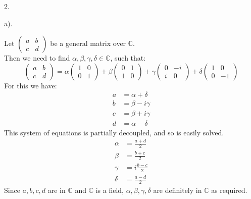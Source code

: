 \documentclass[a4paper,12pt]{article}
\begin{document}
2.
\begin{minipage}[t]{0.9\textwidth}
  a).
  \begin{minipage}[t]{\textwidth}
    Let $\left(\begin{matrix} a & b \\ c & d\end{matrix}\right)$ be a general matrix over $\mathbb{C}$.\\
    Then we need to find $\alpha, \beta, \gamma, \delta \in \mathbb{C}$, such that:
    \begin{equation*}
      \left(\begin{matrix} a & b \\ c & d\end{matrix}\right) = \alpha \left(\begin{matrix}1 & 0 \\ 0 & 1\end{matrix}\right)
        + \beta \left(\begin{matrix}0 & 1 \\ 1 & 0\end{matrix}\right) + \gamma \left(\begin{matrix}0 & -i \\ i & 0\end{matrix}\right) + \delta\left(\begin{matrix}1 & 0 \\ 0 & -1\end{matrix}\right)
    \end{equation*}
    For this we have:
    \begin{align*}
      a &= \alpha + \delta\\
      b &= \beta -i\gamma\\
      c &= \beta  + i\gamma\\
      d &= \alpha - \delta
    \end{align*}
    This system of equations is partially decoupled, and so is easily solved.
    \begin{align*}
      \alpha  &= \frac{a + d}{2}\\
      \beta &= \frac{b + c}{2}\\
      \gamma &= i\frac{b - c}{2}\\
      \delta &= \frac{a - d}{2} 
    \end{align*}
    Since $a, b, c, d$ are in $\mathbb{C}$ and $\mathbb{C}$ is a field, $\alpha, \beta, \gamma, \delta$ are definitely in $\mathbb{C}$ as required.
  \end{minipage}
\end{minipage}
\end{document}

